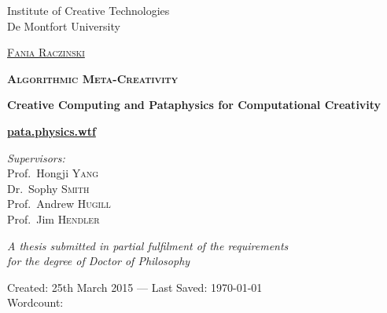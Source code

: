 
\begin{titlingpage}
\begin{center}

Institute of Creative Technologies\\
De Montfort University

\vspace{1cm}

\textsc{\huge \href{http://fania.uk}{Fania Raczinski}}

\vspace{1.5cm}


\textsc{\bfseries\scshape\sffamily \fontsize{40}{30}\selectfont Algorithmic Meta-Creativity}

\vspace{1cm}

{\huge \bfseries Creative Computing and Pataphysics for Computational Creativity}

\vspace{1cm}
{\Huge \textbf{\url{pata.physics.wtf}}}
\vspace{1.5cm}

\emph{Supervisors:}\\
{Prof.\ Hongji \textsc{Yang}}\\
{Dr.\ Sophy \textsc{Smith}}\\
{Prof.\ Andrew \textsc{Hugill}}\\
{Prof.\ Jim \textsc{Hendler}}

\vspace{1.5cm}

\large \textit{A thesis submitted in partial fulfilment of the requirements\\ for the degree of Doctor of Philosophy}

\vfill

Created: {25th March 2015} --- Last Saved: {\today}\\
Wordcount: \wordcount

\end{center}
\end{titlingpage}
